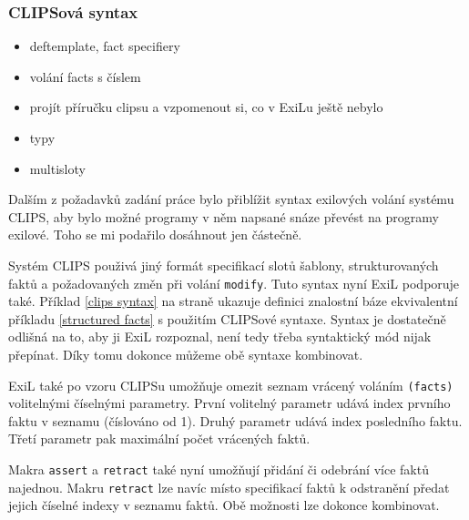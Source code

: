 \subsubsection{CLIPSová syntax}
\begin{framed}
  \begin{itemize}
    \item deftemplate, fact specifiery
    \item volání facts s číslem
    \item projít příručku clipsu a vzpomenout si, co v ExiLu ještě nebylo
    \item typy
    \item multisloty
  \end{itemize}
\end{framed}

Dalším z požadavků zadání práce bylo přiblížit syntax exilových volání systému
CLIPS, aby bylo možné programy v něm napsané snáze převést na programy exilové.
Toho se mi podařilo dosáhnout jen částečně.

Systém CLIPS použivá jiný formát specifikací slotů šablony, strukturovaných
faktů a požadovaných změn při volání \verb|modify|. Tuto syntax nyní ExiL podporuje
také. Příklad \ref{clips syntax} na straně \pageref{clips syntax} ukazuje
definici znalostní báze ekvivalentní příkladu \ref{structured facts} s použitím
CLIPSové syntaxe. Syntax je dostatečně odlišná na to, aby ji ExiL rozpoznal,
není tedy třeba syntaktický mód nijak přepínat. Díky tomu dokonce můžeme obě
syntaxe kombinovat.

ExiL také po vzoru CLIPSu umožňuje omezit seznam vrácený voláním \verb|(facts)|
volitelnými číselnými parametry. První volitelný parametr udává index prvního
faktu v seznamu (číslováno od 1). Druhý parametr udává index posledního faktu.
Třetí parametr pak maximální počet vrácených faktů.

Makra \verb|assert| a \verb|retract| také nyní umožňují přidání či odebrání
více faktů najednou. Makru \verb|retract| lze navíc místo specifikací faktů k
odstranění předat jejich číselné indexy v seznamu faktů. Obě možnosti lze
dokonce kombinovat.


